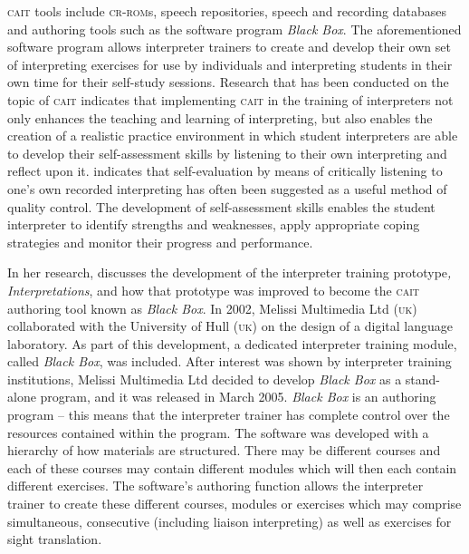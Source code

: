 \documentclass[output=paper]{langsci/langscibook}
\begin{document}
\textsc{cait} tools include \textsc{cr-rom}s, speech repositories, speech and recording data\-bases and authoring tools such as the software program \textit{Black Box}. The aforementioned software program allows interpreter trainers to create and develop their own set of interpreting exercises for use by individuals and interpreting students in their own time for their self-study sessions. Research that has been conducted on the topic of \textsc{cait} \citep{Sandrelli2007a,Pinazo2008,Lim2014} indicates that implementing \textsc{cait} in the training of interpreters not only enhances the teaching and learning of interpreting, but also enables the creation of a realistic practice environment in which student interpreters are able to develop their self-assessment skills by listening to their own interpreting and reflect upon it. \citet[252]{Bartlomiejczyk2007} indicates that self-evaluation by means of critically listening to one’s own recorded interpreting has often been suggested as a useful method of quality control. The development of self-assessment skills enables the student interpreter to identify strengths and weaknesses, apply appropriate coping strategies and monitor their progress and performance.

In her research, \citet{Sandrelli2007b} discusses the development of the interpreter training prototype\textit{, Interpretations}, and how that prototype was improved to become the \textsc{cait} authoring tool known as \textit{Black Box}. In 2002, Melissi Multimedia Ltd (\textsc{uk}) collaborated with the University of Hull (\textsc{uk}) on the design of a digital language laboratory. As part of this development, a dedicated interpreter training module, called \textit{Black Box}, was included. After interest was shown by interpreter training institutions, Melissi Multimedia Ltd decided to develop \textit{Black Box} as a stand-alone program, and it was released in March 2005. \textit{Black Box} is an authoring program – this means that the interpreter trainer has complete control over the resources contained within the program. The software was developed with a hierarchy of how materials are structured. There may be different courses and each of these courses may contain different modules which will then each contain different exercises. The software’s authoring function allows the interpreter trainer to create these different courses, modules or exercises which may comprise simultaneous, consecutive (including liaison interpreting) as well as exercises for sight translation. 
\end{document}
